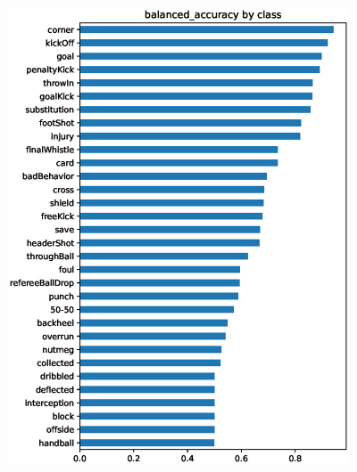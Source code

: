 \begin{figure}
    \centering
    \begin{subfigure}{.24\textwidth}
        \centering
        \includegraphics[width=0.99\textwidth, keepaspectratio, interpolate]{img/07_balanced_accuracy_by_class_test_202012-2218-2841.eps}
    \end{subfigure}%
    \begin{subfigure}{.24\textwidth}
        \centering

\end{subfigure}
\end{figure}
